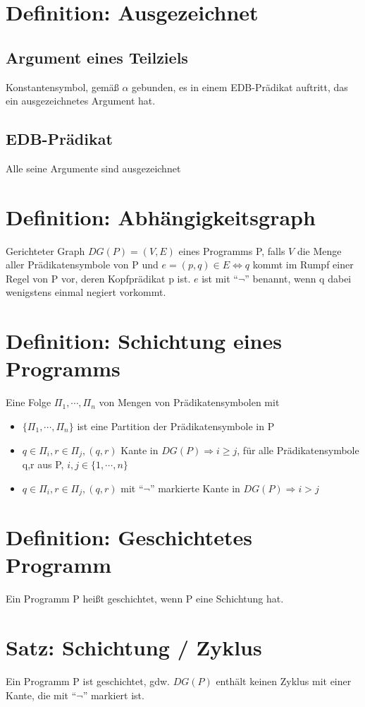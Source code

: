 \documentclass[12pt, a4paper]{article}
\begin{document}
\section*{Definition: Ausgezeichnet}
\subsection*{Argument eines Teilziels}
Konstantensymbol, gemäß $\alpha$ gebunden, es in einem EDB-Prädikat auftritt, das ein ausgezeichnetes Argument hat.

\subsection*{EDB-Prädikat}
Alle seine Argumente sind ausgezeichnet

\section*{Definition: Abhängigkeitsgraph}
Gerichteter Graph $DG(P) = (V,E)$ eines Programms P, falls $V$ die Menge aller Prädikatensymbole von P und $e = (p,q) \in E \Leftrightarrow q$ kommt im Rumpf einer Regel von P vor, deren Kopfprädikat p ist. $e$ ist mit ``$\lnot$'' benannt, wenn q dabei wenigstens einmal negiert vorkommt.

\section*{Definition: Schichtung eines Programms}
Eine Folge $\Pi_1, \cdots, \Pi_n$ von Mengen von Prädikatensymbolen mit
\begin{itemize}
	\item $\{ \Pi_1, \cdots, \Pi_n \}$ ist eine Partition der Prädikatensymbole in P
	\item $q \in \Pi_i, r \in \Pi_j, (q,r)$ Kante in $DG(P) \Rightarrow i \ge j$, für alle Prädikatensymbole q,r aus P, $i,j \in \{1, \cdots, n\}$
	\item $q \in \Pi_i, r \in \Pi_j, (q,r)$ mit ``$\lnot$'' markierte Kante in $DG(P) \Rightarrow i > j$
\end{itemize}

\section*{Definition: Geschichtetes Programm}
Ein Programm P heißt geschichtet, wenn P eine Schichtung hat.

\section*{Satz: Schichtung / Zyklus}
Ein Programm P ist geschichtet, gdw. $DG(P)$ enthält keinen Zyklus mit einer Kante, die mit ``$\lnot$'' markiert ist.
\end{document}
